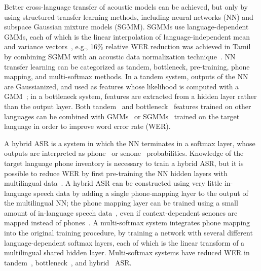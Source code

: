 Better cross-language transfer of acoustic models can be achieved, but
only by using structured transfer learning methods, including neural
networks (NN) and subspace Gaussian mixture models (SGMM).  SGMMs use
language-dependent GMMs, each of which is the linear interpolation of
language-independent mean and variance vectors~\cite{Povey2011}, e.g.,
16\% relative WER reduction was achieved in Tamil by combining SGMM
with an acoustic data normalization technique~\cite{Mohan2014}.  NN
transfer learning can be categorized as tandem, bottleneck,
pre-training, phone mapping, and multi-softmax methods.  In a tandem
system, outputs of the NN are Gaussianized, and used as features whose
likelihood is computed with a GMM~\cite{Hermansky2000}; in a
bottleneck system, features are extracted from a hidden layer rather
than the output layer. Both tandem~\cite{Stolcke2006} and
bottleneck~\cite{Vesely2012} features trained on other languages can
be combined with GMMs~\cite{Vesely2012} or SGMMs~\cite{Imseng2014}
trained on the target language in order to improve word error rate
(WER).

A hybrid ASR is a system in which the NN terminates in a softmax
layer, whose outputs are interpreted as phone~\cite{Morgan95} or
senone~\cite{Dahl2012} probabilities.  Knowledge of the target
language phone inventory is necessary to train a hybrid ASR, but it is
possible to reduce WER by first pre-training the NN hidden layers with
multilingual data~\cite{Huang2013,Swietojanski2012}.  A hybrid ASR can be
constructed using very little in-language speech data by adding a
single phone-mapping layer to the output of the multilingual NN; the
phone mapping layer can be trained using a small amount of in-language
speech data~\cite{Sim2008}, even if context-dependent senones are
mapped instead of phones~\cite{Do2012}.  A multi-softmax system
integrates phone mapping into the original training procedure, by
training a network with several different language-dependent softmax
layers, each of which is the linear transform of a multilingual shared
hidden layer.  Multi-softmax systems have reduced WER in
tandem~\cite{Scanzio2008}, bottleneck~\cite{Vesely2012}, and
hybrid~\cite{Huang2013} ASR.

